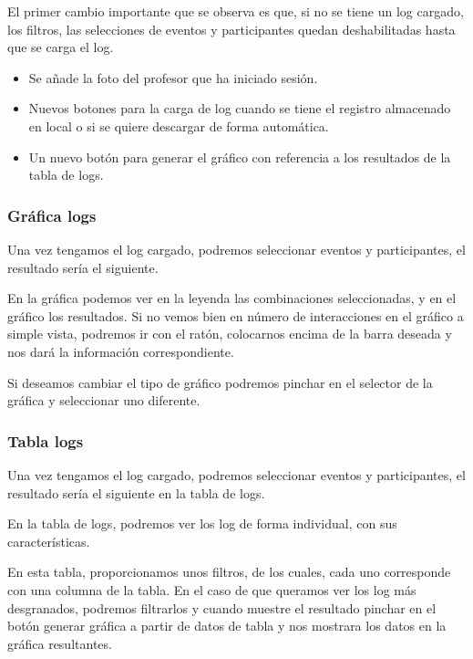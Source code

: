 El primer cambio importante que se observa es que, si no se tiene un log cargado, los filtros, las selecciones de eventos y participantes quedan deshabilitadas hasta que se carga el log.

\begin{itemize}
	\tightlist
	\item
	Se añade la foto del profesor que ha iniciado sesión.
	\item
	Nuevos botones para la carga de log cuando se tiene el registro almacenado en local o si se quiere descargar de forma automática.
	\item
	Un nuevo botón para generar el gráfico con referencia a los resultados de la tabla de logs.
\end{itemize}

\newpage\subsubsection{Gráfica logs}\label{grafica-logs}

Una vez tengamos el log cargado, podremos seleccionar eventos y participantes, el resultado sería el siguiente.


En la gráfica podemos ver en la leyenda las combinaciones seleccionadas, y en el gráfico los resultados. Si no vemos bien en número de interacciones en el gráfico a simple vista, podremos ir con el ratón, colocarnos encima de la barra deseada y nos dará la información correspondiente.

Si deseamos cambiar el tipo de gráfico podremos pinchar en el selector de la gráfica y seleccionar uno diferente.

\newpage\subsubsection{Tabla logs}\label{tabla-logs}

Una vez tengamos el log cargado, podremos seleccionar eventos y participantes, el resultado sería el siguiente en la tabla de logs.


En la tabla de logs, podremos ver los log de forma individual, con sus características.

En esta tabla, proporcionamos unos filtros, de los cuales, cada uno corresponde con una columna de la tabla. En el caso de que queramos ver los log más desgranados, podremos filtrarlos y cuando muestre el resultado pinchar en el botón generar gráfica a partir de datos de tabla y nos mostrara los datos en la gráfica resultantes.



















